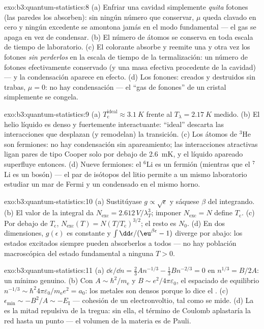 \begin{solution}{exo:b3:quantum-statistics:8}
(a) Enfriar una cavidad simplemente \emph{quita} fotones (las paredes los
absorben): sin ningún número que conservar, $\mu$ queda clavado en cero y
ningún excedente se amontona jamás en el modo fundamental --- el gas se
apaga en vez de condensar. (b) El número de átomos se conserva en toda
escala de tiempo de laboratorio. (c) El colorante absorbe y reemite una y otra
vez los fotones \emph{sin perderlos} en la escala de tiempo de la
termalización: un número de fotones efectivamente conservado (y una
masa efectiva procedente de la cavidad) --- y la condensación aparece en efecto.
(d) Los fonones: creados y destruidos sin trabas, $\mu = 0$: no hay
condensación --- el ``gas de fonones'' de un cristal simplemente se congela.
\end{solution}

\begin{solution}{exo:b3:quantum-statistics:9}
(a) $T_{\text{c}}^{\text{ideal}} \approx \qty{3.1}{K}$ frente al
$T_\lambda = \qty{2.17}{K}$ medido. (b) El helio líquido es denso
y fuertemente interactuante: ``ideal'' descarta las interacciones que
desplazan (y remodelan) la transición. (c) Los átomos de $^3$He son fermiones:
no hay condensación sin apareamiento; las interacciones atractivas ligan
pares de tipo Cooper solo por debajo de \qty{2.6}{mK}, y el líquido apareado
superfluye entonces. (d) Nueve fermiones: el $^6$Li es un fermión (mientras
que el $^7$Li es un bosón) --- el par de isótopos del litio permite a un mismo
laboratorio estudiar un mar de Fermi y un condensado en el mismo horno.
\end{solution}

\begin{solution}{exo:b3:quantum-statistics:10}
(a) Sustitúyase $g \propto \sqrt\epsilon$ y sáquese $\beta$ del integrando.
(b) El valor de la integral da $N_{\text{exc}} =
2.612\,V/\lambda_T^3$; imponer $N_{\text{exc}} = N$ define
$T_{\text{c}}$. (c) Por debajo de $T_{\text{c}}$, $N_{\text{exc}}(T) =
N(T/T_{\text{c}})^{3/2}$; el resto es $N_0$. (d) En dos
dimensiones, $g(\epsilon)$ es constante y $\int\dd\epsilon/(\eu^{
\beta\epsilon} - 1)$ diverge por abajo: los estados excitados
siempre pueden absorberlos a todos --- no hay población macroscópica del
estado fundamental a ninguna $T > 0$.
\end{solution}

\begin{solution}{exo:b3:quantum-statistics:11}
(a) $\dd\epsilon/\dd n = \tfrac23 An^{-1/3} - \tfrac13 Bn^{-2/3} =
0$ en $n^{1/3} = B/2A$: un mínimo genuino. (b) Con $A \sim
\hbar^2/m_{\text{e}}$ y $B \sim e^2/4\pi\varepsilon_0$, el
espaciado de equilibrio $n^{-1/3} \sim \hbar^2 4\pi\varepsilon_0/
m_{\text{e}}e^2 = a_0$: los metales son densos porque lo dice el . (c) $\epsilon_{\min} \sim -B^2/A \sim -E_{\text{I}}$
--- cohesión de un electronvoltio, tal como se mide. (d) La 
es la mitad repulsiva de la tregua: sin ella, el término de Coulomb
aplastaría la red hasta un punto --- el volumen de la materia es de Pauli.
\end{solution}

